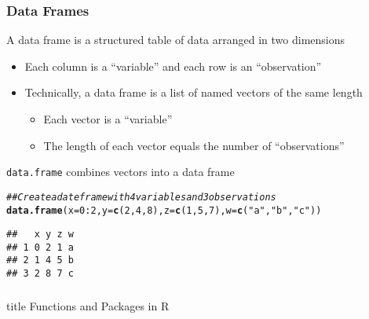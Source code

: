 \documentclass{beamer}\usepackage[]{graphicx}\usepackage[]{color}
\makeatletter
\newcommand{\hlnum}[1]{\textcolor[rgb]{0.686,0.059,0.569}{#1}}%
\newcommand{\hlstr}[1]{\textcolor[rgb]{0.192,0.494,0.8}{#1}}%
\newcommand{\hlcom}[1]{\textcolor[rgb]{0.678,0.584,0.686}{\textit{#1}}}%
\newcommand{\hlopt}[1]{\textcolor[rgb]{0,0,0}{#1}}%
\newcommand{\hlstd}[1]{\textcolor[rgb]{0.345,0.345,0.345}{#1}}%
\newcommand{\hlkwc}[1]{\textcolor[rgb]{0.333,0.667,0.333}{#1}}%
\newcommand{\hlkwd}[1]{\textcolor[rgb]{0.737,0.353,0.396}{\textbf{#1}}}%
\newenvironment{kframe}{%
 \def\at@end@of@kframe{}%
 \ifinner\ifhmode%
  \def\at@end@of@kframe{\end{minipage}}%
  \begin{minipage}{\columnwidth}%
 \fi\fi%
 \def\FrameCommand##1{\hskip\@totalleftmargin \hskip-\fboxsep
 \colorbox{shadecolor}{##1}\hskip-\fboxsep
     \hskip-\linewidth \hskip-\@totalleftmargin \hskip\columnwidth}%
 \MakeFramed {\advance\hsize-\width
   \@totalleftmargin\z@ \linewidth\hsize
   \@setminipage}}%
 {\par\unskip\endMakeFramed%
 \at@end@of@kframe}
\newenvironment{knitrout}{}{} %
\makeatother
\begin{document}
\begin{frame}[fragile]\frametitle{Data Frames}
    A data frame is a structured table of data arranged in two dimensions
    \begin{itemize}
        \item Each column is a ``variable'' and each row is an ``observation''
        \item Technically, a data frame is a list of named vectors of the same length
        \begin{itemize}
            \item Each vector is a ``variable''
            \item The length of each vector equals the number of ``observations''
        \end{itemize}
    \end{itemize}
    \vspace{3ex}
    \texttt{data.frame} combines vectors into a data frame
\begin{knitrout}\footnotesize
{}\color{fgcolor}\begin{kframe}
\begin{alltt}
\hlcom{## Create a date frame with 4 variables and 3 observations}
\hlkwd{data.frame}\hlstd{(}\hlkwc{x} \hlstd{=} \hlnum{0}\hlopt{:}\hlnum{2}\hlstd{,} \hlkwc{y} \hlstd{=} \hlkwd{c}\hlstd{(}\hlnum{2}\hlstd{,} \hlnum{4}\hlstd{,} \hlnum{8}\hlstd{),} \hlkwc{z} \hlstd{=} \hlkwd{c}\hlstd{(}\hlnum{1}\hlstd{,} \hlnum{5}\hlstd{,} \hlnum{7}\hlstd{),} \hlkwc{w} \hlstd{=} \hlkwd{c}\hlstd{(}\hlstr{"a"}\hlstd{,} \hlstr{"b"}\hlstd{,} \hlstr{"c"}\hlstd{))}
\end{alltt}
\begin{verbatim}
##   x y z w
## 1 0 2 1 a
## 2 1 4 5 b
## 3 2 8 7 c
\end{verbatim}
\end{kframe}
\end{knitrout}
\end{frame}

\begin{frame}\frametitle{}
    \vfill
    \centering
    \begin{beamercolorbox}[center]{title}
        \Large Functions and Packages in R
    \end{beamercolorbox}
    \vfill
\end{frame}
\end{document}
